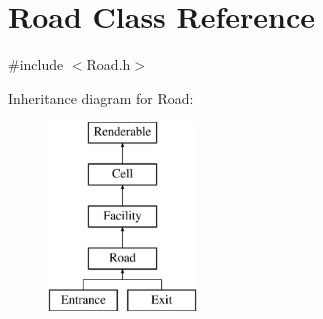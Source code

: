 \hypertarget{classRoad}{\section{Road Class Reference}
\label{classRoad}
}


{\ttfamily \#include $<$Road.\+h$>$}

Inheritance diagram for Road\+:\begin{figure}[H]
\begin{center}
\leavevmode
\includegraphics[height=5.000000cm]{classRoad}
\end{center}
\end{figure}
